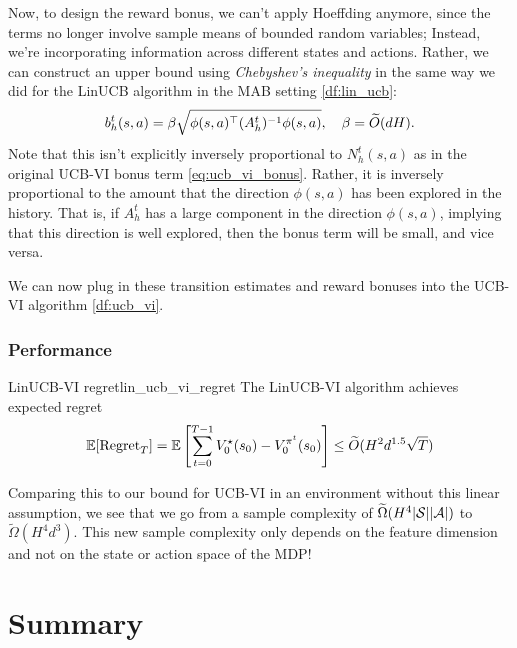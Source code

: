 \documentclass[\main/main]{subfiles}
\begin{document}
Now, to design the reward bonus, we can't apply Hoeffding anymore, since the terms no longer involve sample means of bounded random variables; Instead, we're incorporating information across different states and actions. Rather, we can construct an upper bound using \emph{Chebyshev's inequality} in the same way we did for the LinUCB algorithm in the MAB setting \ref{df:lin_ucb}:
\[
    b^t_h(s, a) = \beta \sqrt{\phi(s, a)^\top (A^t_h)^{-1} \phi(s, a)}, \quad \beta = \widetilde O(d H).
\]
Note that this isn't explicitly inversely proportional to $N_h^t(s, a)$ as in the original UCB-VI bonus term \ref{eq:ucb_vi_bonus}. Rather, it is inversely proportional to the amount that the direction $\phi(s, a)$ has been explored in the history. That is, if $A_h^t$ has a large component in the direction $\phi(s, a)$, implying that this direction is well explored, then the bonus term will be small, and vice versa.

We can now plug in these transition estimates and reward bonuses into the UCB-VI algorithm \ref{df:ucb_vi}.

\subsubsection{Performance}

\begin{theorem}{LinUCB-VI regret}{lin_ucb_vi_regret}
    The LinUCB-VI algorithm achieves expected regret
    \[
        \operatorname*{\mathbb{E}}[\text{Regret}_T] = \operatorname*{\mathbb{E}}\left[\sum_{t=0}^{T-1} V^\star_0(s_0) - V^{\pi^t}_0(s_0) \right] \le \widetilde O(H^2 d^{1.5} \sqrt{T})
    \]
\end{theorem}

Comparing this to our bound for UCB-VI in an environment without this linear assumption, we see that we go from a sample complexity of $\widetilde \Omega(H^4 |\mathcal{S}||\mathcal{A}|)$ to $\tilde \Omega(H^4 d^{3})$. This new sample complexity only depends on the feature dimension and not on the state or action space of the MDP!



\section{Summary}
\end{document}
